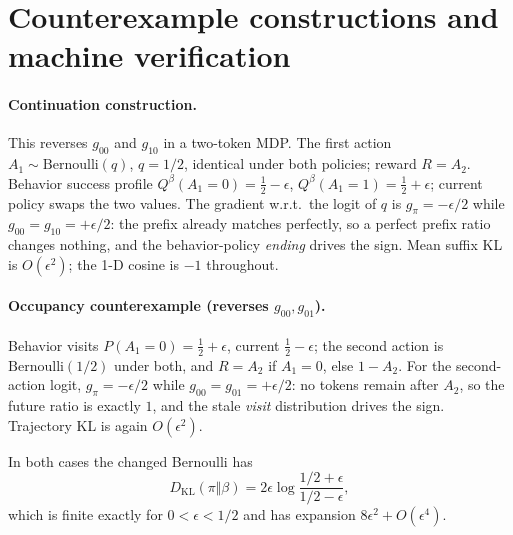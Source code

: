 \documentclass[11pt]{article}
\newcommand{\goo}{g_{00}}
\newcommand{\gto}{g_{10}}
\newcommand{\got}{g_{01}}
\newcommand{\gpi}{g_{\pi}}
\begin{document}
\appendix

\section{Counterexample constructions and machine verification}
\label{app:cex}

\paragraph{Continuation construction.} This reverses $\goo$ and $\gto$ in a
two-token MDP. The
first action $A_1\sim\mathrm{Bernoulli}(q)$, $q{=}1/2$, identical under both
policies; reward $R=A_2$. Behavior success profile
$Q^\beta(A_1{=}0)=\frac12-\epsilon$, $Q^\beta(A_1{=}1)=\frac12+\epsilon$;
current policy swaps the two values. The gradient w.r.t.\ the logit of $q$ is
$\gpi=-\epsilon/2$ while $\goo=\gto=+\epsilon/2$: the prefix already matches
perfectly, so a perfect prefix ratio changes nothing, and the behavior-policy
\emph{ending} drives the sign. Mean suffix KL is $O(\epsilon^2)$; the 1-D
cosine is $-1$ throughout.

\paragraph{Occupancy counterexample (reverses $\goo,\got$).} Behavior visits
$P(A_1{=}0)=\frac12+\epsilon$, current $\frac12-\epsilon$; the second action is
$\mathrm{Bernoulli}(1/2)$ under both, and
$R=A_2$ if $A_1{=}0$, else $1-A_2$. For the second-action logit,
$\gpi=-\epsilon/2$ while $\goo=\got=+\epsilon/2$: no tokens remain after
$A_2$, so the future ratio is exactly $1$, and the stale \emph{visit}
distribution drives the sign. Trajectory KL is again $O(\epsilon^2)$.

In both cases the changed Bernoulli has
\[
D_{\mathrm{KL}}(\pi\Vert\beta)
=2\epsilon\log\frac{1/2+\epsilon}{1/2-\epsilon},
\]
which is finite exactly for $0<\epsilon<1/2$ and has expansion
$8\epsilon^2+O(\epsilon^4)$.
\end{document}
